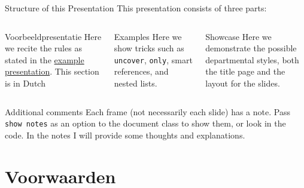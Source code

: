 \documentclass[showdate=true, slidenumbers=slide]{beamerruhuisstijl169}
\begin{document}
\begin{frame}{Structure of this Presentation}
    This presentation consists of three parts:
    \begin{columns}[T,totalwidth=\linewidth]
        \begin{column}{0.3\textwidth}
            \begin{block}{Voorbeeldpresentatie}
                Here we recite the rules as stated in the \href{http://www.ru.nl/publish/pages/596464/ru_powerpoint_algemeen_2014_toelichting.ppt}{example presentation}. This section is in Dutch
            \end{block}
        \end{column}
        \begin{column}{0.3\textwidth}
            \begin{block}{Examples}
                Here we show tricks such as \texttt{uncover}, \texttt{only}, smart references, and nested lists.
            \end{block}
        \end{column}
        \begin{column}{0.3\textwidth}
            \begin{block}{Showcase}
                Here we demonstrate the possible departmental styles, both the title page and the layout for the slides.
            \end{block}
        \end{column}
    \end{columns}

    \begin{block}{Additional comments}
        Each frame (not necessarily each slide) has a note. Pass \texttt{show notes} as an option to the document class to show them, or look in the code. In the notes I will provide some thoughts and explanations.
    \end{block}
\end{frame}


\section{Voorwaarden}
\end{document}
